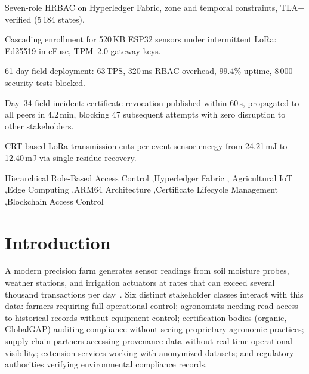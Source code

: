 \documentclass[a4paper,fleqn]{cas-dc}
\begin{document}
\begin{highlights}
\item Seven-role HRBAC on Hyperledger Fabric, zone and temporal
  constraints, TLA+ verified (5\,184 states).
\item Cascading enrollment for 520\,KB ESP32 sensors under intermittent
  LoRa: Ed25519 in eFuse, TPM~2.0 gateway keys.
\item 61-day field deployment: 63\,TPS, 320\,ms RBAC overhead,
  99.4\% uptime, 8\,000 security tests blocked.
\item Day~34 field incident: certificate revocation published
  within 60\,s, propagated to all peers in 4.2\,min, blocking
  47 subsequent attempts with zero disruption to other stakeholders.
\item CRT-based LoRa transmission cuts per-event sensor energy from
  24.21\,mJ to 12.40\,mJ via single-residue recovery.
\end{highlights}

\begin{keywords}
Hierarchical Role-Based Access Control \sep Hyperledger Fabric \sep
Agricultural IoT \sep Edge Computing \sep ARM64 Architecture \sep Certificate
Lifecycle Management \sep Blockchain Access Control
\end{keywords}

\maketitle

\section{Introduction}
\label{sec:intro}

A modern precision farm generates sensor readings from soil moisture
probes, weather stations, and irrigation actuators at rates that can
exceed several thousand transactions per day~\cite{zhang2002precision}.
Six distinct stakeholder classes interact with this data: farmers
requiring full operational control; agronomists needing read access to
historical records without equipment control; certification bodies
(organic, GlobalGAP) auditing compliance without seeing proprietary
agronomic practices; supply-chain partners accessing provenance data
without real-time operational visibility; extension services working
with anonymized datasets; and regulatory authorities verifying
environmental compliance records.
\end{document}
